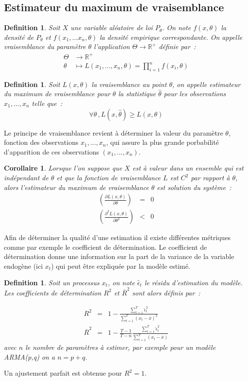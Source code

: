 \documentclass[11pt]{scrartcl} %
\newtheorem{corollary}{Corollaire}[theorem]
\newtheorem{Def}[theorem]{Definition}
\begin{document}
\subsection{Estimateur du maximum de vraisemblance}
\begin{Def}\label{estimateur}
Soit $X$ une variable aléatoire de loi $P_{\theta}$. On note $f(x,\theta)$ la densité de $P_{\theta}$ et $f(x_1,...x_n,\theta)$ la densité empirique correspondante. On appelle vraisemblance du paramètre $\theta$ l'application $\Theta\rightarrow\mathbb{R}^+$ définie par~:
\begin{align*}
\Theta &\rightarrow \mathbb{R}^+\\
\theta &\mapsto L(x_1,...,x_n,\theta)=\prod_{i=1}^n f(x_i,\theta)
\end{align*}
\end{Def}
\begin{Def}\label{MLE}
Soit $L(x,\theta)$ la vraisemblance au point $\theta$, on appelle estimateur du maximum de vraisemblance pour $\theta$ la statistique $\hat{\theta}$ pour les observations $x_1,...,x_n$ telle que~:
$$
\forall \theta \, ,  L(x,\hat{\theta})\geq L(x,\theta)
$$
\end{Def}
Le principe de vraisemblance revient à déterminer la valeur du paramètre $\theta$, fonction des observations $x_1,...,x_n$, qui assure la plus grande porbabilité d'apparition de ces observations $(x_1,...,x_n)$.
\begin{corollary}
Lorsque l'on suppose que $X$ est à valeur dans un ensemble qui est indépendant de $\theta$ et que la fonction de vraisemblance $L$ est $C^2$ par rapport à $\theta$, alors l'estimateur du maximum de vraisemblance $\hat{\theta}$ est solution du système~:
\begin{eqnarray}
\left(\frac{\partial L(x,\theta)}{\partial \theta}\right)&=&0\\
\left(\frac{\partial^2 L(x,\theta)}{\partial \theta^2}\right)&<&0
\end{eqnarray}
\end{corollary}
Afin de déterminer la qualité d'une estimation il existe différentes métriques comme par exemple le coefficient de détermination. Le coefficient de détermination donne une information sur la part de la variance de la variable endogène (ici $x_t$) qui peut être expliquée par la modèle estimé.
\begin{Def}
Soit un processus $x_t$, on note $\hat{\epsilon}_t$ le résidu d'estimation du modèle. Les coefficients de détermination $R^2$ et $\overline{R}^2$ sont alors définis par~:

\begin{eqnarray}
R^2&=&1-\frac{\sum_{t=1}^T\hat{\epsilon}_t^2}{\sum_{t=1}^T\left(x_t-\overline{x}\right)^2}\\
\overline{R}^2&=&1-\frac{T-1}{T-n}\frac{\sum_{t=1}^T\hat{\epsilon}_t^2}{\sum_{t=1}^T\left(x_t-\overline{x}\right)}
\end{eqnarray}
avec $n$ le nombre de paramètres à estimer, par exemple pour un modèle ARMA(p,q) on a $n=p+q$.
\end{Def}
Un ajustement parfait est obtenue pour $R^2=1$.
\end{document}
